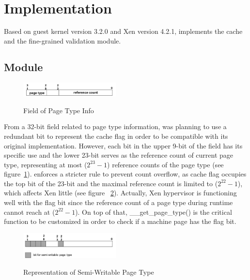 \section{Implementation} \label{sec:impl}

Based on guest kernel version 3.2.0 and Xen version 4.2.1, \name implements the cache and the fine-grained validation module.

\subsection{\name Module}

\begin{figure}[ht]
\centering
\includegraphics[width=0.45\textwidth]{image/implementation/field-of-page-type-info.png} \\
\caption{Field of Page Type Info}
\label{fig:field-of-page-type-info}
\end{figure}

From a 32-bit field related to page type information, \name was planning to use a redundant bit to represent the cache flag in order to be compatible with its original implementation. However, each bit in the upper 9-bit of the field has its specific use and the lower 23-bit serves as the reference count of current page type, representing at most ($2^{23}-1$) reference counts of the page type (see figure~\ref{fig:field-of-page-type-info}). \name enforces a stricter rule to prevent count overflow, as cache flag occupies the top bit of the 23-bit and the maximal reference count is limited to ($2^{22}-1$), which affects Xen little (see figure ~\ref{fig:field-of-semi-type}). Actually, Xen hypervisor is functioning well with the flag bit since the reference count of a page type during runtime cannot reach at ($2^{22}-1$). On top of that, \_\_get\_page\_type() is the critical function to be customized in order to check if a machine page has the flag bit.

\begin{figure}[ht]
\centering
\includegraphics[width=0.45\textwidth]{image/implementation/field-of-semi-type.png} \\
\caption{Representation of Semi-Writable Page Type}
\label{fig:field-of-semi-type}
\end{figure}

